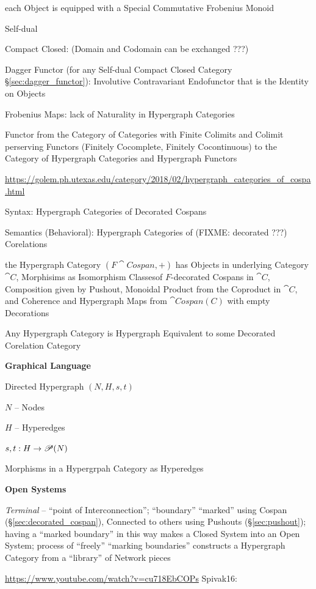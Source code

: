 each Object is equipped with a Special Commutative Frobenius
Monoid

Self-dual

Compact Closed: (Domain and Codomain can be exchanged ???) %

Dagger Functor (for any Self-dual Compact Closed Category
\S\ref{sec:dagger_functor}): Involutive Contravariant Endofunctor that
is the Identity on Objects

Frobenius Maps: lack of Naturality in Hypergraph Categories

Functor from the Category of Categories with Finite Colimits and
Colimit perserving Functors (Finitely Cocomplete, Finitely
Cocontinuous) to the Category of Hypergraph Categories and Hypergraph
Functors

\url{https://golem.ph.utexas.edu/category/2018/02/hypergraph_categories_of_cospa.html}

Syntax: Hypergraph Categories of Decorated Cospans

Semantics (Behavioral): Hypergraph Categories of (FIXME: decorated ???)
Corelations

the Hypergraph Category $(F\cat{Cospan},+)$ has Objects in underlying Category
$\cat{C}$, Morphisims as Isomorphism Classesof $F$-decorated Cospans in
$\cat{C}$, Composition given by Pushout, Monoidal Product from the Coproduct in
$\cat{C}$, and Coherence and Hypergraph Maps from $\cat{Cospan(C)}$ with empty
Decorations

Any Hypergraph Category is Hypergraph Equivalent to some Decorated Corelation
Category


\textbf{Graphical Language}

Directed Hypergraph $(N,H,s,t)$

$N$ -- Nodes

$H$ -- Hyperedges

$s,t : H \rightarrow \mathscr{P}(N)$

Morphisms in a Hypergrpah Category as Hyperedges


\textbf{Open Systems}

\emph{Terminal} -- ``point of Interconnection''; ``boundary''
``marked'' using Cospan (\S\ref{sec:decorated_cospan}), Connected to
others using Pushouts (\S\ref{sec:pushout}); having a ``marked
boundary'' in this way makes a Closed System into an Open System;
process of ``freely'' ``marking boundaries'' constructs a Hypergraph
Category from a ``library'' of Network pieces


\asterism

\url{https://www.youtube.com/watch?v=cu718EbCOPs} Spivak16:

